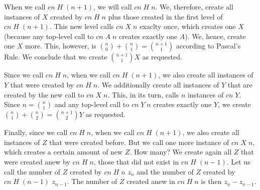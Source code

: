 \documentclass[tikz]{scrreprt}
\newcommand{\Conid}[1]{\mathit{#1}}
\newcommand{\Varid}[1]{\mathit{#1}}
\begin{document}
When we call \ensuremath{\Varid{cn}\;\Conid{H}\;(\Varid{n}\mathbin{+}\mathrm{1})}, we will call \ensuremath{\Varid{cn}\;\Conid{H}\;\Varid{n}}.
We, therefore, create all instances of \ensuremath{\Conid{X}} created by \ensuremath{\Varid{cn}\;\Conid{H}\;\Varid{n}}
plus those created in the first level of \ensuremath{\Varid{cn}\;\Conid{H}\;(\Varid{n}\mathbin{+}\mathrm{1})}.
This new level calls \ensuremath{\Varid{cn}\;\Conid{X}\;\Varid{n}} exaclty once,
which creates one \ensuremath{\Conid{X}} (because any top-level call to \ensuremath{\Varid{cn}\;\Conid{A}\;\Varid{n}}
creates exactly one \ensuremath{\Conid{A}}).
We, hence, create one \ensuremath{\Conid{X}} more.
This, however, is 
$\binom{n}{0} + \binom{n}{1} = \binom{n+1}{1}$
according to Pascal's Rule.
We conclude that we create $\binom{n+1}{1}X$ as requested.

Since we call \ensuremath{\Varid{cn}\;\Conid{H}\;\Varid{n}}, when we call \ensuremath{\Varid{cn}\;\Conid{H}\;(\Varid{n}\mathbin{+}\mathrm{1})}, 
we also create all instances of \ensuremath{\Conid{Y}} that were created
by \ensuremath{\Varid{cn}\;\Conid{H}\;\Varid{n}}. We additionally create all instances of \ensuremath{\Conid{Y}}
that are created by the new call to \ensuremath{\Varid{cn}\;\Conid{X}\;\Varid{n}}.
This, in its turn, calls $n$ instances of \ensuremath{\Varid{cn}\;\Conid{Y}}.
Since $n = \binom{n}{1}$ and any top-level call to 
\ensuremath{\Varid{cn}\;\Conid{Y}\;\Varid{n}} creates exactly one \ensuremath{\Conid{Y}}, we create
$\binom{n}{1} + \binom{n}{2} = \binom{n+1}{2}Y$ as requested.

Finally, since we call \ensuremath{\Varid{cn}\;\Conid{H}\;\Varid{n}}, when we call \ensuremath{\Varid{cn}\;\Conid{H}\;(\Varid{n}\mathbin{+}\mathrm{1})},
we also create all instances of \ensuremath{\Conid{Z}} that were created before.
But we call one more instance of \ensuremath{\Varid{cn}\;\Conid{X}\;\Varid{n}}, which creates a
certain amount of new \ensuremath{\Conid{Z}}. How many?
We create again all \ensuremath{\Conid{Z}} that were created anew by \ensuremath{\Varid{cn}\;\Conid{H}\;\Varid{n}},
those that did not exist in \ensuremath{\Varid{cn}\;\Conid{H}\;(\Varid{n}\mathbin{-}\mathrm{1})}.
Let us call the number of \ensuremath{\Conid{Z}} created by \ensuremath{\Varid{cn}\;\Conid{H}\;\Varid{n}} $z_n$
and the number of \ensuremath{\Conid{Z}} created by \ensuremath{\Varid{cn}\;\Conid{H}\;(\Varid{n}\mathbin{-}\mathrm{1})} $z_{n-1}$.
The number of \ensuremath{\Conid{Z}} created anew in \ensuremath{\Varid{cn}\;\Conid{H}\;\Varid{n}} is then 
$z_n - z_{n-1}$.
\end{document}
